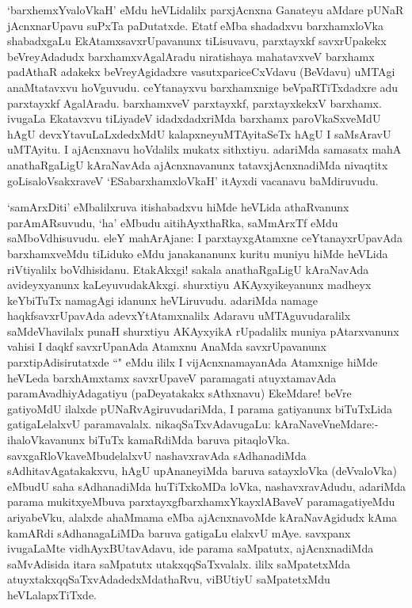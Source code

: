 \begin{artha}%
`barxhemxYvaloVkaH' eMdu heVLidalilx parxjAcnxna Ganateyu aMdare pUNaR jAcnxnarUpavu suPxTa paDutatxde. Etatf eMba shadadxvu barxhamxloVka shabadxgaLu EkAtamxsavxrUpavanunx tiLisuvavu, parxtayxkf savxrUpakekx beVreyAdadudx barxhamxvAgalAradu niratishaya mahatavxveV barxhamx padAthaR adakekx beVreyAgidadxre vasutxpariceCxVdavu (BeVdavu) uMTAgi anaMtatavxvu hoVguvudu. ceYtanayxvu barxhamxnige beVpaRTiTxdadxre adu parxtayxkf AgalAradu. barxhamxveV parxtayxkf, parxtayxkekxV barxhamx. ivugaLa Ekatavxvu tiLiyadeV idadxdadxriMda barxhamx paroVkaSxveMdU hAgU devxYtavuLaLxdedxMdU kalapxneyuMTAyitaSeTx hAgU I saMsAravU uMTAyitu. I ajAcnxnavu hoVdalilx mukatx sithxtiyu. adariMda samasatx mahA anathaRgaLigU kAraNavAda ajAcnxnavanunx tatavxjAcnxnadiMda nivaqtitx goLisaloVsakxraveV `ESabarxhamxloVkaH' itAyxdi vacanavu baMdiruvudu. 
\end{artha}

\begin{artha}
`samArxDiti' eMbalilxruva itishabadxvu hiMde heVLida athaRvanunx parAmARsuvudu, `ha' eMbudu aitihAyxthaRka, saMmArxTf eMdu saMboVdhisuvudu. eleY mahArAjane: I parxtayxgAtamxne ceYtanayxrUpavAda barxhamxveMdu tiLiduko eMdu janakananunx kuritu muniyu hiMde heVLida riVtiyalilx boVdhisidanu. EtakAkxgi! sakala anathaRgaLigU kAraNavAda avideyxyanunx kaLeyuvudakAkxgi. shurxtiyu AKAyxyikeyanunx madheyx keYbiTuTx namagAgi idanunx heVLiruvudu. adariMda namage haqkfsavxrUpavAda adevxYtAtamxnalilx Adaravu uMTAguvudaralilx saMdeVhavilalx punaH shurxtiyu AKAyxyikA rUpadalilx muniya pAtarxvanunx vahisi I daqkf savxrUpanAda Atamxnu AnaMda savxrUpavanunx parxtipAdisirutatxde ``\stext " eMdu ililx I vijAcnxnamayanAda Atamxnige hiMde heVLeda barxhAmxtamx savxrUpaveV paramagati atuyxtamavAda paramAvadhiyAdagatiyu (paDeyatakakx sAthxnavu) EkeMdare! beVre gatiyoMdU ilalxde pUNaRvAgiruvudariMda, I parama gatiyanunx biTuTxLida gatigaLelalxvU paramavalalx. nikaqSaTxvAdavugaLu: kAraNaveVneMdare:- ihaloVkavanunx biTuTx kamaRdiMda baruva pitaqloVka. savxgaRloVkaveMbudelalxvU nashavxravAda sAdhanadiMda sAdhitavAgatakakxvu, hAgU upAnaneyiMda baruva satayxloVka (deVvaloVka) eMbudU saha sAdhanadiMda huTiTxkoMDa loVka, nashavxravAdudu, adariMda parama mukitxyeMbuva parxtayxgfbarxhamxYkayxlABaveV paramagatiyeMdu ariyabeVku, alalxde ahaMmama eMba ajAcnxnavoMde kAraNavAgidudx kAma kamARdi sAdhanagaLiMDa baruva gatigaLu elalxvU mAye. savxpanx ivugaLaMte vidhAyxBUtavAdavu, ide parama saMpatutx, ajAcnxnadiMda saMvAdisida itara saMpatutx utakxqqSaTxvalalx. ililx saMpatetxMda atuyxtakxqqSaTxvAdadedxMdathaRvu, viBUtiyU saMpatetxMdu heVLalapxTiTxde. 
\end{artha}%


